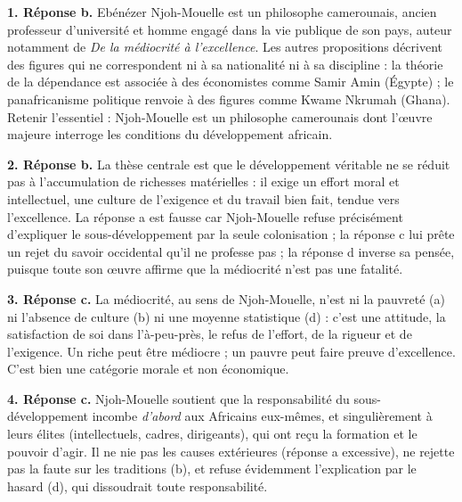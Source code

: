 \documentclass[11pt]{article}
\newcommand{\cle}[1]{{\popxbold\color{popdark}#1}}
\begin{document}
\begin{corrige}

\textbf{1. Réponse b.} Ebénézer Njoh-Mouelle est un \cle{philosophe camerounais}, ancien professeur d'université et homme engagé dans la vie publique de son pays, auteur notamment de \emph{De la médiocrité à l'excellence}. Les autres propositions décrivent des figures qui ne correspondent ni à sa nationalité ni à sa discipline : la théorie de la dépendance est associée à des économistes comme Samir Amin (Égypte) ; le panafricanisme politique renvoie à des figures comme Kwame Nkrumah (Ghana). Retenir l'essentiel : Njoh-Mouelle est un philosophe camerounais dont l'œuvre majeure interroge les conditions du développement africain.

\textbf{2. Réponse b.} La thèse centrale est que le développement véritable ne se réduit pas à l'accumulation de richesses matérielles : il exige un effort \cle{moral} et \cle{intellectuel}, une culture de l'exigence et du travail bien fait, tendue vers l'excellence. La réponse a est fausse car Njoh-Mouelle refuse précisément d'expliquer le sous-développement par la seule colonisation ; la réponse c lui prête un rejet du savoir occidental qu'il ne professe pas ; la réponse d inverse sa pensée, puisque toute son œuvre affirme que la médiocrité n'est pas une fatalité.

\textbf{3. Réponse c.} La médiocrité, au sens de Njoh-Mouelle, n'est ni la pauvreté (a) ni l'absence de culture (b) ni une moyenne statistique (d) : c'est une \cle{attitude}, la satisfaction de soi dans l'à-peu-près, le refus de l'effort, de la rigueur et de l'exigence. Un riche peut être médiocre ; un pauvre peut faire preuve d'excellence. C'est bien une catégorie morale et non économique.

\textbf{4. Réponse c.} Njoh-Mouelle soutient que la responsabilité du sous-développement incombe \emph{d'abord} aux Africains eux-mêmes, et singulièrement à leurs \cle{élites} (intellectuels, cadres, dirigeants), qui ont reçu la formation et le pouvoir d'agir. Il ne nie pas les causes extérieures (réponse a excessive), ne rejette pas la faute sur les traditions (b), et refuse évidemment l'explication par le hasard (d), qui dissoudrait toute responsabilité.
\end{corrige}
\end{document}
